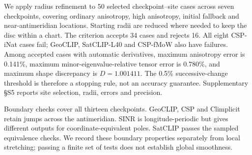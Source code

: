 We apply radius refinement to 50 selected checkpoint--site cases across seven checkpoints, covering ordinary anisotropy, high anisotropy, initial fallback and near-antimeridian locations. Starting radii are reduced where needed to keep the disc within a chart. The criterion accepts 34 cases and rejects 16. All eight CSP-iNat cases fail; GeoCLIP, SatCLIP-L40 and CSP-fMoW also have failures. Among accepted cases with automatic derivatives, maximum anisotropy error is 0.141\%, maximum minor-eigenvalue-relative tensor error is 0.780\%, and maximum shape discrepancy is $D=1.001411$. The 0.5\% successive-change threshold is therefore a stopping rule, not an accuracy guarantee. Supplementary \S S5 reports site selection, radii, errors and precision.

Boundary checks cover all thirteen checkpoints. GeoCLIP, CSP and Climplicit retain jumps across the antimeridian. SINR is longitude-periodic but gives different outputs for coordinate-equivalent poles. SatCLIP passes the sampled equivalence checks. We record these boundary properties separately from local stretching; passing a finite set of tests does not establish global smoothness.
